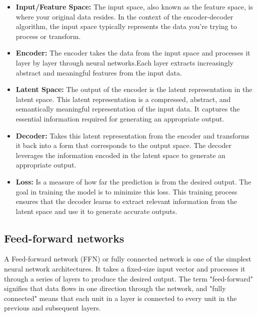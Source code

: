\documentclass{article}
\begin{document}
\begin{itemize}
    \item \textbf{Input/Feature Space:} The input space, also known as the feature space, is where your original data resides. In the context of the encoder-decoder algorithm, the input space typically represents the data you're trying to process or transform.
    \item \textbf{Encoder:} The encoder takes the data from the input space and processes it layer by layer through neural networks.Each layer extracts increasingly abstract and meaningful features from the input data. 
    \item \textbf{Latent Space:} The output of the encoder is the latent representation in the latent space. This latent representation is a compressed, abstract, and semantically meaningful representation of the input data. It captures the essential information required for generating an appropriate output.
    \item \textbf{Decoder:} Takes this latent representation from the encoder and transforms it back into a form that corresponds to the output space. The decoder leverages the information encoded in the latent space to generate an appropriate output.
    \item \textbf{Loss:} Is a measure of how far the prediction is from the desired output. The goal in training the model is to minimize this loss. This training process ensures that the decoder learns to extract relevant information from the latent space and use it to generate accurate outputs.
\end{itemize}


\subsection{Feed-forward networks}
A Feed-forward network (FFN) or fully connected network is one of the simplest neural network architectures. 
It takes a fixed-size input vector and processes it through a series of layers to produce the desired output. 
The term "feed-forward" signifies that data flows in one direction through the network, and "fully connected" means that each unit in a layer is connected to every unit in the previous and subsequent layers.
\end{document}
